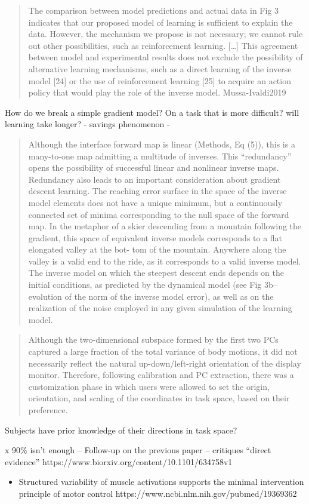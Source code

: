 \begin{quote}
The comparison between model predictions and actual data in Fig 3
indicates that our proposed model of learning is sufficient to explain
the data. However, the mechanism we propose is not necessary; we cannot
rule out other possibilities, such as reinforcement learning.
{[}\ldots{]} This agreement between model and experimental results does
not exclude the possibility of alternative learning mechanisms, such as
a direct learning of the inverse model {[}24{]} or the use of
reinforcement learning {[}25{]} to acquire an action policy that would
play the role of the inverse model. Mussa-Ivaldi2019
\end{quote}

How do we break a simple gradient model? On a task that is more
difficult? will learning take longer? - savings phenomenon -

\begin{quote}
Although the interface forward map is linear (Methods, Eq (5)), this is
a many-to-one map admitting a multitude of inverses. This ``redundancy''
opens the possibility of successful linear and nonlinear inverse maps.
Redundancy also leads to an important consideration about gradient
descent learning. The reaching error surface in the space of the inverse
model elements does not have a unique minimum, but a continuously
connected set of minima corresponding to the null space of the forward
map. In the metaphor of a skier descending from a mountain following the
gradient, this space of equivalent inverse models corresponds to a flat
elongated valley at the bot- tom of the mountain. Anywhere along the
valley is a valid end to the ride, as it corresponds to a valid inverse
model. The inverse model on which the steepest descent ends depends on
the initial conditions, as predicted by the dynamical model (see Fig
3b--evolution of the norm of the inverse model error), as well as on the
realization of the noise employed in any given simulation of the
learning model.
\end{quote}

\begin{quote}
Although the two-dimensional subspace formed by the first two PCs
captured a large fraction of the total variance of body motions, it did
not necessarily reflect the natural up-down/left-right orientation of
the display monitor. Therefore, following calibration and PC extraction,
there was a customization phase in which users were allowed to set the
origin, orientation, and scaling of the coordinates in task space, based
on their preference.
\end{quote}

Subjects have prior knowledge of their directions in task space?

x 90\% isn't enough -- Follow-up on the previous paper -- critiques
``direct evidence'' https://www.biorxiv.org/content/10.1101/634758v1

\begin{itemize}
\tightlist
\item
  Structured variability of muscle activations supports the minimal
  intervention principle of motor control
  https://www.ncbi.nlm.nih.gov/pubmed/19369362
\end{itemize}
